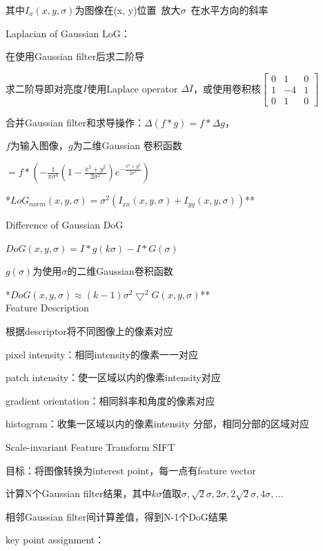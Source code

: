\documentclass[UTF8]{ctexart}
\begin{document}
  \quad \quad 其中$I_x(x, y, \sigma)$为图像在(x, y)位置\ 放大$\sigma$\ 在水平方向的斜率

  Laplacian of Gaussian LoG：

  \quad 在使用Gaussian filter后求二阶导

  \quad \quad 求二阶导即对亮度$I$使用Laplace operator $\Delta I$，或使用卷积核$
    \begin{bmatrix}
      0 & 1 & 0 \\
      1 & -4 & 1 \\
      0 & 1 & 0
      \end{bmatrix}$

  \quad 合并Gaussian filter和求导操作：$\Delta (f * g) = f * \Delta g$，
  
  \quad \quad $f$为输入图像，$g$为二维Gaussian 卷积函数

  \quad \quad $ = f * (-\frac{1}{\pi\sigma^4}(1 - \frac{x^2 + y^2}{2\sigma^2})e^{-\frac{x^2 + y^2}{2\sigma^2}})$

  \quad **$LoG_{norm}(x, y, \sigma) = \sigma^2(I_{xx}(x, y, \sigma) + I_{yy}(x, y, \sigma))$**

  Difference of Gaussian DoG
  
  \quad $DoG(x, y, \sigma) = I * g(k\sigma) - I * G(\sigma)$
  
  \quad \quad $g(\sigma)$为使用$\sigma$的二维Gaussian卷积函数
  
  \quad **$DoG(x, y, \sigma) \approx (k - 1)\sigma^2\bigtriangledown^2G(x, y, \sigma)$**\\
Feature Description

  根据descriptor将不同图像上的像素对应

  \quad pixel intensity：相同intensity的像素一一对应

  \quad patch intensity：使一区域以内的像素intensity对应

  \quad gradient orientation：相同斜率和角度的像素对应

  \quad histogram：收集一区域以内的像素intensity 分部，相同分部的区域对应

  Scale-invariant Feature Transform SIFT

  \quad 目标：将图像转换为interest point，每一点有feature vector

  \quad 计算N个Gaussian filter结果，其中$k\sigma$值取$\sigma, \sqrt{2}\sigma, 2\sigma, 2\sqrt{2}\sigma, 4\sigma,...$

  \quad 相邻Gaussian filter间计算差值，得到N-1个DoG结果

  \quad key point assignment：
  
\end{document}
